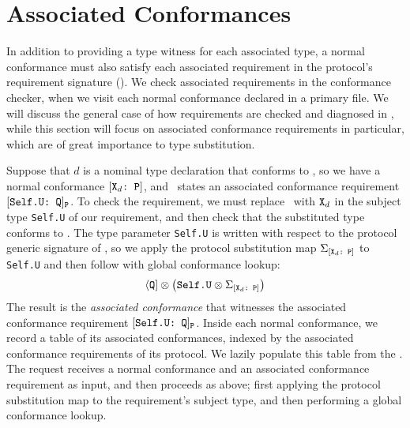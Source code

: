 \documentclass[../generics]{subfiles}
\begin{document}
\section{Associated Conformances}\label{associated conformances}

In addition to providing a type witness for each associated type, a normal conformance must also satisfy each associated requirement in the protocol's requirement signature (). We check associated requirements in the conformance checker, when we visit each normal conformance declared in a primary file. We will discuss the general case of how requirements are checked and diagnosed in , while this section will focus on associated conformance requirements in particular, which are of great importance to type substitution.

Suppose that $d$ is a nominal type declaration that conforms to \tP, so we have a normal conformance $[\texttt{$\texttt{X}_d$:~P}]$, and \tP\ states an associated conformance requirement $[\texttt{Self.U:~Q}]_{\texttt{P}}$. To check the requirement, we must replace \IndexSelf\tSelf\ with $\texttt{X}_d$ in the subject type \texttt{Self.U} of our requirement, and then check that the substituted type conforms to \tQ. The type parameter \texttt{Self.U} is written with respect to the protocol generic signature of \tP, so we apply the protocol substitution map $\Sigma_{[\texttt{$\texttt{X}_d$:~P}]}$ to \texttt{Self.U} and then follow with global conformance lookup:
\[
\langle\texttt{Q}] \otimes \big(\texttt{Self.U} \otimes \Sigma_{[\texttt{$\texttt{X}_d$:~P}]}\big)
\]
The result is the \emph{associated conformance} that witnesses the associated conformance requirement $[\texttt{Self.U:~Q}]_{\texttt{P}}$. Inside each normal conformance, we record a table of its associated conformances, indexed by the associated conformance requirements of its protocol. We lazily populate this table from the . The request receives a normal conformance and an associated conformance requirement as input, and then proceeds as above; first applying the protocol substitution map to the requirement's subject type, and then performing a global conformance lookup.
\end{document}
